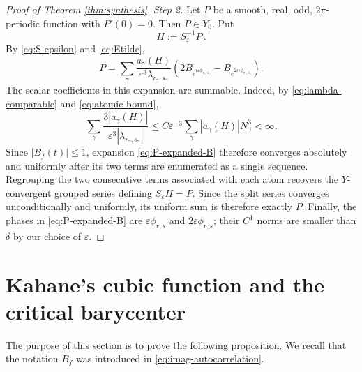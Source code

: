 \documentclass[11pt]{amsart}
\theoremstyle{definition}
\theoremstyle{remark}
\begin{document}
\begin{proof}[Proof of Theorem \ref{thm:synthesis}]
\emph{Step 2.}
Let $P$ be a smooth, real, odd, $2\pi$-periodic function with $P'(0)=0$. Then $P\in Y_0$. Put
\[
 H:=S_\varepsilon^{-1}P \,.
\]
By \eqref{eq:S-epsilon} and \eqref{eq:Etilde},
\begin{equation}\label{eq:P-expanded-B}
 P
 =\sum_\gamma
 \frac{a_\gamma(H)}{\varepsilon^3\lambda_{r_\gamma,s_\gamma}}
 \left(2B_{e^{i\varepsilon\phi_{r_\gamma,s_\gamma}}}
 -B_{e^{2i\varepsilon\phi_{r_\gamma,s_\gamma}}}
 \right).
\end{equation}
The scalar coefficients in this expansion are summable.  Indeed, by \eqref{eq:lambda-comparable} and \eqref{eq:atomic-bound},
\begin{equation}\label{eq:coefficient-total-variation}
 \sum_\gamma
 \frac{3|a_\gamma(H)|}{\varepsilon^3|\lambda_{r_\gamma,s_\gamma}|}
 \leq C\varepsilon^{-3}
 \sum_\gamma|a_\gamma(H)|N_\gamma^3
 <\infty.
\end{equation}
Since $|B_f(t)|\leq1$, expansion \eqref{eq:P-expanded-B} therefore converges absolutely and uniformly after its two terms are enumerated as a single sequence.  Regrouping the two consecutive terms associated with each atom recovers the $Y$-convergent grouped series defining $S_\varepsilon H=P$. Since the split series converges unconditionally and uniformly, its uniform sum is therefore exactly $P$.  Finally, the phases in \eqref{eq:P-expanded-B} are $\varepsilon\phi_{r,s}$ and $2\varepsilon\phi_{r,s}$; their $C^1$ norms are smaller than $\delta$ by our choice of $\varepsilon$.
\end{proof}


\section{Kahane's cubic function and the critical barycenter}\label{sec:kahane}

The purpose of this section is to prove the following proposition. We recall that the notation $B_f$ was introduced in \eqref{eq:imag-autocorrelation}.
\end{document}
